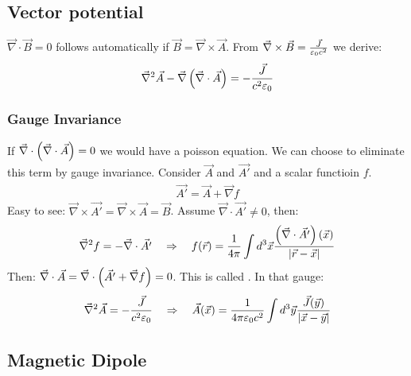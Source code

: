 \subsection{Vector potential}

$\vec{\nabla} \cdot \vec{B} = 0$ follows automatically if
$\vec{B} = \vec{\nabla} \times \vec{A}$. From $\vec{\nabla} \times \vec{B}
= \frac{\vec{J}}{\varepsilon_0 c^2}$ we derive:
\begin{align*}
    \vec{\nabla}^2 \vec{A} - \vec{\nabla} \left( \vec{\nabla} \cdot \vec{A} \right)
    = - \frac{\vec{J}}{c^2 \varepsilon_0}
\end{align*}

\subsubsection{Gauge Invariance}

If $\vec{\nabla} \cdot \left( \vec{\nabla} \cdot \vec{A} \right) = 0$ we would
have a poisson equation. We can choose to eliminate this term by gauge
invariance. Consider $\vec{A}$ and $\vec{A'}$ and a scalar functioin $f$.
\begin{align*}
    \vec{A'} = \vec{A} + \vec{\nabla} f
\end{align*}
Easy to see: $\vec{\nabla} \times \vec{A'} = \vec{\nabla} \times \vec{A} = \vec{B}$.
Assume $\vec{\nabla} \cdot \vec{A'} \neq 0$, then:
\begin{align*}
    \vec{\nabla}^2 f = - \vec{\nabla} \cdot \vec{A'}
    \hspace{10pt} \Rightarrow \hspace{10pt}
    f(\vec{r}) = \frac{1}{4 \pi} \int d^3 \vec{x} \frac{\left( \vec{\nabla} \cdot \vec{A'} \right)(\vec{x})}{\left\vert \vec{r} - \vec{x} \right\vert}
\end{align*}
Then: $\vec{\nabla} \cdot \vec{A} = \vec{\nabla} \cdot \left( \vec{A'} + \vec{\nabla} f \right)
= 0$. This is called . In that gauge:
\begin{align*}
    \vec{\nabla}^2 \vec{A} = - \frac{\vec{J}}{c^2 \varepsilon_0}
    \hspace{10pt} \Rightarrow \hspace{10pt}
    \vec{A}(\vec{x}) = \frac{1}{4 \pi \varepsilon_0 c^2} \int d^3 \vec{y} \frac{\vec{J}(\vec{y})}{\left\vert \vec{x} - \vec{y} \right\vert}
\end{align*}

\subsection{Magnetic Dipole}

